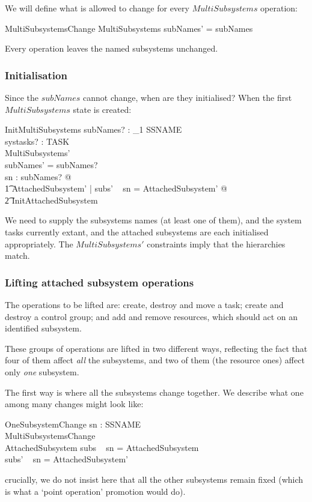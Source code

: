 \documentclass[a4paper,twoside,12pt]{article}
\begin{document}
We will define what is allowed to change for every $MultiSubsystems$ operation:

\begin{schema}{MultiSubsystemsChange}
\Delta MultiSubsystems
\where
subNames' = subNames
\end{schema}
Every operation leaves the named subsystems unchanged.

\subsubsection{Initialisation}

Since the $subNames$ cannot change, when are they initialised? When the first $MultiSubsystems$ state is created:

\begin{schema}{InitMultiSubsystems}
subNames? : \finset_1 SSNAME \\
systasks? : \finset TASK \\
MultiSubsystems' \\
\where
subNames' = subNames? \\
\forall sn : subNames? @ \\
\t1 \exists AttachedSubsystem' | subs' ~ sn = \theta AttachedSubsystem' @ \\
    \t2 InitAttachedSubsystem
\end{schema}
We need to supply the subsystems names (at least one of them), and the system tasks currently
extant, and the attached subsystems are each
initialised appropriately. The $MultiSubsystems'$ constraints imply that the hierarchies match.

\subsubsection{Lifting attached subsystem operations}

The operations to be lifted are: create,  destroy and move a task;
create and destroy a control group; and add and remove resources, which should act on an
identified subsystem.

These groups of operations are lifted in two different ways, reflecting the fact that four of them
affect \emph{all} the subsystems, and two of them (the resource ones) affect only \emph{one} subsystem.

The first way is where all the subsystems change together. We describe what one among many changes might look like:
\begin{schema}{OneSubsystemChange}
sn : SSNAME \\
MultiSubsystemsChange \\
\Delta AttachedSubsystem
\where
subs ~ sn = \theta AttachedSubsystem \\
subs' ~ sn = \theta AttachedSubsystem'
\end{schema}
crucially, we do not insist here that all the other subsystems remain fixed (which is what a `point operation' promotion would do).
\end{document}
